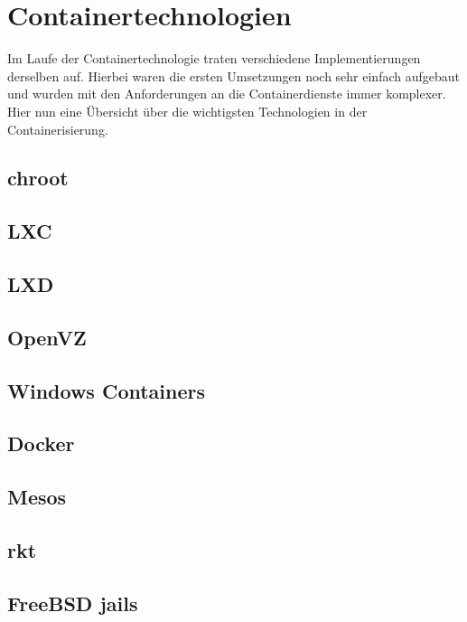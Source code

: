 \section{Containertechnologien} 
\label{sec:Containertechnologien}

Im Laufe der  Containertechnologie traten verschiedene Implementierungen derselben auf. Hierbei waren die ersten Umsetzungen noch sehr einfach aufgebaut und wurden mit den Anforderungen an die Containerdienste immer komplexer. Hier nun eine Übersicht über die wichtigsten Technologien in der Containerisierung.

\subsection{chroot}
\label{sec:chroot}

\subsection{LXC}
\label{sec:lxc}

\subsection{LXD}
\label{sec:lxd}

\subsection{OpenVZ}
\label{sec:OpenVZ}

\subsection{Windows Containers}
\label{sec:WindowsContainers}

\subsection{Docker}
\label{sec:Docker}

\subsection{Mesos}
\label{sec:Mesos}

\subsection{rkt}
\label{sec:rkt}

\subsection{FreeBSD jails}
\label{sec:jails}

